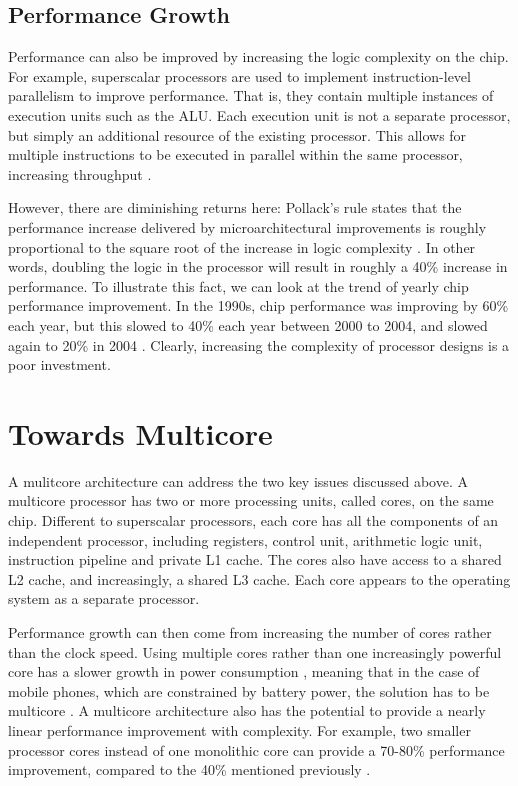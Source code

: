 \documentclass[bsc,frontabs,singlespacing,parskip,deptreport]{infthesis}
\begin{document}
\subsection{Performance Growth} \label{performance-growth}
Performance can also be improved by increasing the logic complexity on the chip. For example, superscalar processors are used to implement instruction-level parallelism to improve performance. That is, they contain multiple instances of execution units such as the ALU. Each execution unit is not a separate processor, but simply an additional resource of the existing processor. This allows for multiple instructions to be executed in parallel within the same processor, increasing throughput \cite{stallings}.

However, there are diminishing returns here: Pollack’s rule states that the performance increase delivered by microarchitectural improvements is roughly proportional to the square root of the increase in logic complexity \cite{borkar_2007}. In other words, doubling the logic in the processor will result in roughly a 40\% increase in performance. To illustrate this fact, we can look at the trend of yearly chip performance improvement. In the 1990s, chip performance was improving by 60\% each year, but this slowed to 40\% each year between 2000 to 2004, and slowed again to 20\% in 2004 \cite{geer_2005}. Clearly, increasing the complexity of processor designs is a poor investment.

\section{Towards Multicore} \label{towards-multicore}
A mulitcore architecture can address the two key issues discussed above. A multicore processor has two or more processing units, called cores, on the same chip. Different to superscalar processors, each core has all the components of an independent processor, including registers, control unit, arithmetic logic unit, instruction pipeline and private L1 cache. The cores also have access to a shared L2 cache, and increasingly, a shared L3 cache. Each core appears to the operating system as a separate processor. 

Performance growth can then come from increasing the number of cores rather than the clock speed. Using multiple cores rather than one increasingly powerful core has a slower growth in power consumption \cite{blake_2009}, meaning that in the case of mobile phones, which are constrained by battery power, the solution has to be multicore \cite{berkel_2009}. A multicore architecture also has the potential to provide a nearly linear performance improvement with complexity. For example, two smaller processor cores instead of one monolithic core can provide a 70-80\% performance improvement, compared to the 40\% mentioned previously \cite{borkar_2007}.
\end{document}
